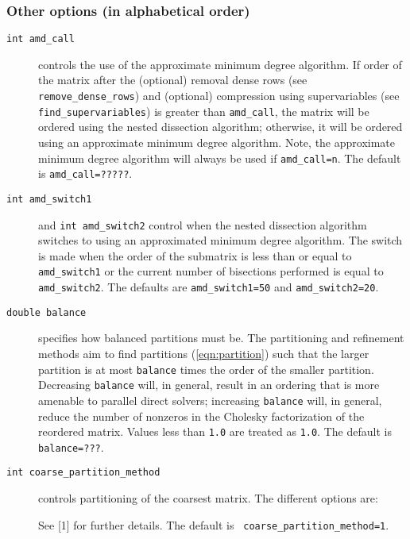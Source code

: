 \subsubsection*{Other options (in alphabetical order)}

\begin{description}
\item[\texttt{int amd\_call}] controls the use of 
the approximate minimum degree algorithm. If order of the matrix after the 
(optional) removal dense rows (see {\tt remove\_dense\_rows}) and (optional) 
compression using supervariables (see {\tt find\_supervariables}) is greater 
than {\tt amd\_call}, the matrix will be ordered using the nested dissection 
algorithm; otherwise, it will be ordered using an approximate minimum 
degree algorithm. Note, the approximate minimum degree algorithm will always be used if {\tt amd\_call=n}. The 
default is {\tt amd\_call=?????}.

\item[\texttt{int amd\_switch1}] and {\tt int amd\_switch2} control
when the nested dissection algorithm switches to using an approximated minimum 
degree algorithm. The switch is made when the order of the submatrix is less 
than or equal to {\tt amd\_switch1} or the current number of 
bisections performed is equal to {\tt amd\_switch2}.  The 
defaults are {\tt amd\_switch1=50} and {\tt amd\_switch2=20}.

\item[\texttt{double balance}] specifies how balanced partitions must be.
The partitioning and refinement
methods aim to find partitions (\ref{eqn:partition}) such that the larger 
partition is at most {\tt balance} times the order of the smaller partition. 
Decreasing {\tt balance} will, in
general, result in an ordering that is more amenable to
parallel direct solvers; increasing {\tt balance} will, in general, reduce the
number of nonzeros in the Cholesky factorization of the reordered matrix. 
Values less than {\tt 1.0} are treated as {\tt 1.0}. The
default is {\tt balance=???}.

\item[\texttt{int coarse\_partition\_method}]
controls partitioning of the coarsest matrix. The different options are:
See [1] for further details. The default is {\tt
coarse\_partition\_method=1}. 



\end{description}
